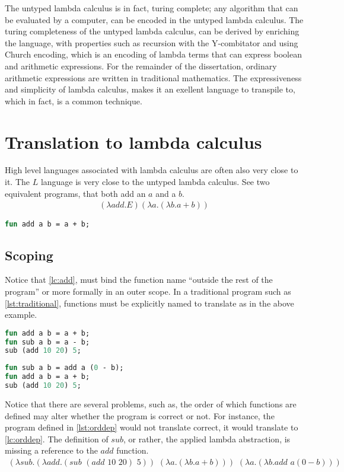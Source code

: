 \documentclass[11pt,oneside,a4paper]{report}
\begin{document}
The untyped lambda calculus is in fact, turing complete; any algorithm that can be evaluated by a computer, can be encoded in the untyped lambda calculus.
The turing completeness of the untyped lambda calculus, can be derived by enriching the language, with properties such as recursion with the Y-combitator and using Church encoding, which is an encoding of lambda terms that can express boolean and arithmetic expressions\cite{church1985calculi}.
For the remainder of the dissertation, ordinary arithmetic expressions are written in traditional mathematics.
The expressiveness and simplicity of lambda calculus, makes it an exellent language to transpile to, which in fact, is a common technique.

\section{Translation to lambda calculus}
High level languages associated with lambda calculus are often also very close to it.
The $L$ language is very close to the untyped lambda calculus.
See two equivalent programs, that both add an $a$ and a $b$.
\begin{align}
(\lambda add . E)(\lambda a . (\lambda b . a + b))
\label{lc:add}
\end{align}
\begin{lstlisting}[language=ML,caption={Add function},xleftmargin=.35\textwidth]
fun add a b = a + b;
\end{lstlisting}

\subsection{Scoping}
Notice that \autoref{lc:add}, must bind the function name ``outside the rest of the program'' or more formally in an outer scope.
In a traditional program such as \autoref{lst:traditional}, functions must be explicitly named to translate as in the above example.
\begin{lstlisting}[language=ML,caption={A traditional program},label={lst:traditional},xleftmargin=.32\textwidth]
fun add a b = a + b;
fun sub a b = a - b;
sub (add 10 20) 5;
\end{lstlisting}
\begin{lstlisting}[language=ML,caption={An order dependant program},label={lst:orddep},xleftmargin=.32\textwidth]
fun sub a b = add a (0 - b);
fun add a b = a + b;
sub (add 10 20) 5;
\end{lstlisting}
Notice that there are several problems, such as, the order of which functions are defined may alter whether the program is correct or not.
For instance, the program defined in \autoref{lst:orddep} would not translate correct, it would translate to \autoref{lc:orddep}.
The definition of $sub$, or rather, the applied lambda abstraction, is missing a reference to the $add$ function.
\begin{align}
(\lambda sub . (\lambda add . (sub \,\, (add \,\, 10 \,\, 20) \,\, 5)) \,\, (\lambda a . (\lambda b . a + b))) \,\, (\lambda a . (\lambda b . add \,\, a (0 - b)))
\label{lc:orddep}
\end{align}
\end{document}

